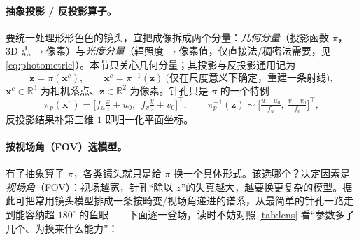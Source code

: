 \paragraph{抽象投影 / 反投影算子。}
要统一处理形形色色的镜头，宜把成像拆成两个分量\cite{carlone2026handbook}：\emph{几何分量}（投影函数 $\pi$，3D 点$\to$像素）与\emph{光度分量}（辐照度$\to$像素值，仅直接法/稠密法需要，见 \cref{eq:photometric}）。本节只关心几何分量；其投影与反投影通用记为
\begin{equation}
  \mathbf{z}=\pi(\mathbf{x}^c),\qquad
  \mathbf{x}^c=\pi^{-1}(\mathbf{z})\ \text{(仅在尺度意义下确定，重建一条射线)},
  \label{eq:abstract-pi}
\end{equation}
$\mathbf{x}^c\in\mathbb{R}^3$ 为相机系点、$\mathbf{z}\in\mathbb{R}^2$ 为像素。针孔只是 $\pi$ 的一个特例
\begin{equation}
  \pi_p(\mathbf{x}^c)=\Big[f_u\tfrac{x}{z}+u_0,\ \ f_v\tfrac{y}{z}+v_0\Big]^\top,\qquad
  \pi_p^{-1}(\mathbf{z})\sim\Big[\tfrac{u-u_0}{f_u},\ \tfrac{v-v_0}{f_v}\Big]^\top,
  \label{eq:pi-pinhole}
\end{equation}
反投影结果补第三维 $1$ 即归一化平面坐标。

\paragraph{按视场角（FOV）选模型。}
有了抽象算子 $\pi$，各类镜头就只是给 $\pi$ 换一个具体形式。该选哪个？决定因素是\emph{视场角}（FOV）：视场越宽，针孔“除以 $z$”的失真越大，越要换更复杂的模型。据此可把常用镜头模型排成一条按畸变/视场角递进的谱系\cite{carlone2026handbook}，从最简单的针孔一路走到能容纳超 $180^\circ$ 的鱼眼——下面逐一登场，读时不妨对照 \cref{tab:lens} 看“参数多了几个、为换来什么能力”：


